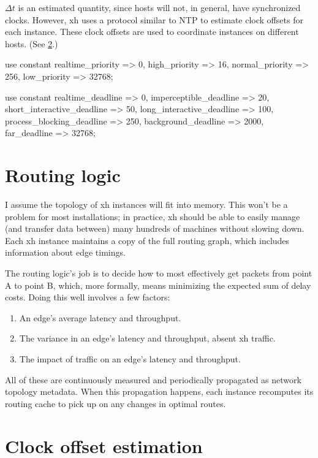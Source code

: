 \documentclass{report}
\begin{document}
    $\Delta t$ is an estimated quantity, since hosts will not, in general, have
    synchronized clocks. However, xh uses a protocol similar to NTP to estimate
    clock offsets for each instance. These clock offsets are used to coordinate
    instances on different hosts. (See \ref{sec:clock-offset-estimation}.)

\begin{perlcode}
use constant {realtime_priority => 0,
              high_priority     => 16,
              normal_priority   => 256,
              low_priority      => 32768};

use constant {realtime_deadline          => 0,
              imperceptible_deadline     => 20,
              short_interactive_deadline => 50,
              long_interactive_deadline  => 100,
              process_blocking_deadline  => 250,
              background_deadline        => 2000,
              far_deadline               => 32768}; \end{perlcode}

\section{Routing logic}\label{sec:routing-logic}
    I assume the topology of xh instances will fit into memory. This won't be a
    problem for most installations; in practice, xh should be able to easily
    manage (and transfer data between) many hundreds of machines without
    slowing down. Each xh instance maintains a copy of the full routing graph,
    which includes information about edge timings.

    The routing logic's job is to decide how to most effectively get packets
    from point A to point B, which, more formally, means minimizing the
    expected sum of delay costs. Doing this well involves a few factors:

\begin{enumerate}
\item{An edge's average latency and throughput.}
\item{The variance in an edge's latency and throughput, absent xh}
       traffic.
\item{The impact of traffic on an edge's latency and throughput.}
\end{enumerate}

    All of these are continuously measured and periodically propagated as
    network topology metadata. When this propagation happens, each instance
    recomputes its routing cache to pick up on any changes in optimal routes.


\section{Clock offset estimation}\label{sec:clock-offset-estimation}
    
\end{document}
